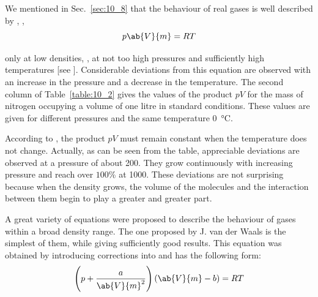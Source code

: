 We mentioned in Sec.~\ref{sec:10_8} that the behaviour of real gases is well described by , \ie,
\begin{equation*}
	p\ab{V}{m} = RT
\end{equation*}

\noindent
only at low densities, \ie, at not too high pressures and sufficiently high temperatures [see ]. Considerable deviations from this equation are observed with an increase in the pressure and a decrease in the temperature. The second column of Table~\ref{table:10_2} gives the values of the product $pV$ for the mass of nitrogen occupying a volume of one litre in standard conditions. These values are given for different pressures and the same temperature \SI{0}{\degreeCelsius}.

\begin{table}[!htb]
	\vspace{-0.2cm}
	\renewcommand{\arraystretch}{1.2}
	\caption{ }
	\vspace{-0.6cm}
	\label{table:10_2}
	\begin{center}\end{center}
\end{table}

According to , the product $pV$ must remain constant when the temperature does not change. Actually, as can be seen from the table, appreciable deviations are observed at a pressure of about \SI{200}{\atm}. They grow continuously with increasing pressure and reach over $100$\% at \SI{1000}{\atm}. These deviations are not surprising because when the density grows, the volume of the molecules and the interaction between them begin to play a greater and greater part.

A great variety of equations were proposed to describe the behaviour of gases within a broad density range. The one proposed by J. van der Waals is the simplest of them, while giving sufficiently good results. This equation was obtained by introducing corrections into  and has the following form:
\begin{equation}\label{eq:10_62}
	\left(p+\frac{a}{\ab{V}{m}^2}\right)(\ab{V}{m} - b) = RT
\end{equation}

